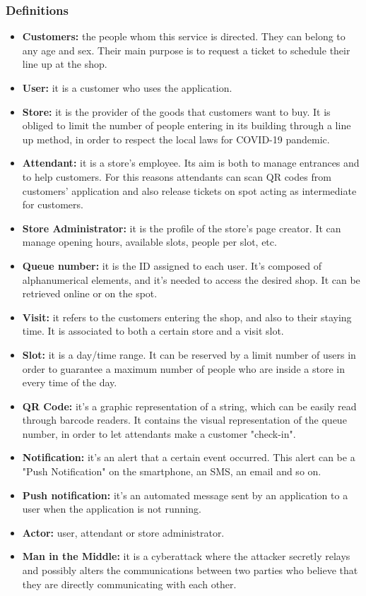 \documentclass[table, 12pt]{article}
\begin{document}
\subsubsection{Definitions}
\begin{itemize}
    \item \textbf{Customers:} the people whom this service is directed. They can belong to any age and sex. Their main purpose is to request a ticket to schedule their line up at the shop.
    \item \textbf{User:} it is a customer who uses the application.\label{User}
    \item \textbf{Store:} it is the provider of the goods that customers want to buy. It is obliged to limit the number of people entering in its building through a line up method, in order to respect the local laws for COVID-19 pandemic.
    \item \textbf{Attendant:} it is a store's employee. Its aim is both to manage entrances and to help customers. For this reasons attendants can scan QR codes from customers' application and also release tickets on spot acting as intermediate for customers.
    \item \textbf{Store Administrator:} it is the profile of the store's page creator. It can manage opening hours, available slots, people per slot, etc.
    \item \textbf{Queue number:} it is the ID assigned to each user. It's composed of alphanumerical elements, and it's needed to access the desired shop. It can be retrieved online or on the spot.
    \item \textbf{Visit:} it refers to the customers entering the shop, and also to their staying time. It is associated to both a certain store and a visit slot.
    \item \textbf{Slot:} it is a day/time range. It can be reserved by a limit number of users in order to guarantee a maximum number of people who are inside a store in every time of the day.
    \item \textbf{QR Code:} it's a graphic representation of a string, which can be easily read through barcode readers. It contains the visual representation of the queue number, in order to let attendants make a customer "check-in".\label{QR}
    \item \textbf{Notification:} it's an alert that a certain event occurred. This alert can be a "Push Notification" on the smartphone, an SMS, an email and so on.
    \item \textbf{Push notification:} it's an automated message sent by an application to a user when the application is not running.
    \item \textbf{Actor:} user, attendant or store administrator.
    \item \textbf{Man in the Middle:} it is a cyberattack where the attacker secretly relays and possibly alters the communications between two parties who believe that they are directly communicating with each other.
\end{itemize}
\end{document}

